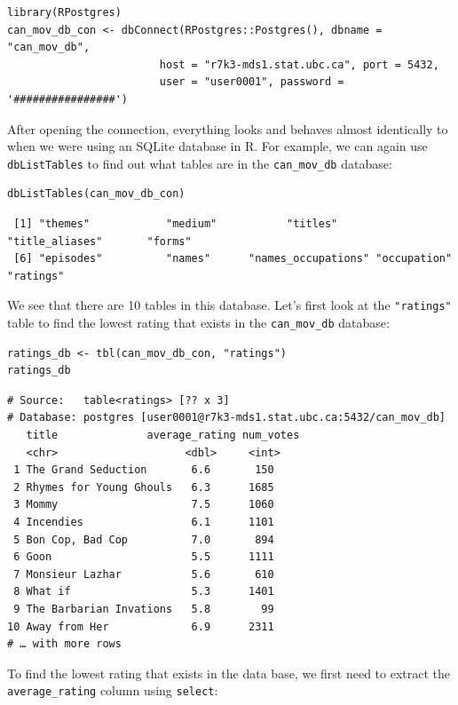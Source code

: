 \documentclass[
]{article}
\begin{document}
\begin{verbatim}
library(RPostgres)
can_mov_db_con <- dbConnect(RPostgres::Postgres(), dbname = "can_mov_db",
                        host = "r7k3-mds1.stat.ubc.ca", port = 5432,
                        user = "user0001", password = '################')
\end{verbatim}

After opening the connection, everything looks and behaves almost
identically to when we were using an SQLite database in R. For example,
we can again use \texttt{dbListTables} to find out what tables are in
the \texttt{can\_mov\_db} database:

\begin{verbatim}
dbListTables(can_mov_db_con)
\end{verbatim}

\begin{verbatim}
 [1] "themes"            "medium"           "titles"     "title_aliases"       "forms"            
 [6] "episodes"          "names"      "names_occupations" "occupation"       "ratings" 
\end{verbatim}

We see that there are 10 tables in this database. Let's first look at
the \texttt{"ratings"} table to find the lowest rating that exists in
the \texttt{can\_mov\_db} database:

\begin{verbatim}
ratings_db <- tbl(can_mov_db_con, "ratings")
ratings_db
\end{verbatim}

\begin{verbatim}
# Source:   table<ratings> [?? x 3]
# Database: postgres [user0001@r7k3-mds1.stat.ubc.ca:5432/can_mov_db]
   title              average_rating num_votes
   <chr>                    <dbl>     <int>
 1 The Grand Seduction       6.6       150
 2 Rhymes for Young Ghouls   6.3      1685
 3 Mommy                     7.5      1060
 4 Incendies                 6.1      1101
 5 Bon Cop, Bad Cop          7.0       894
 6 Goon                      5.5      1111
 7 Monsieur Lazhar           5.6       610
 8 What if                   5.3      1401
 9 The Barbarian Invations   5.8        99
10 Away from Her             6.9      2311
# … with more rows
\end{verbatim}

To find the lowest rating that exists in the data base, we first need to
extract the \texttt{average\_rating} column using \texttt{select}:
\end{document}
